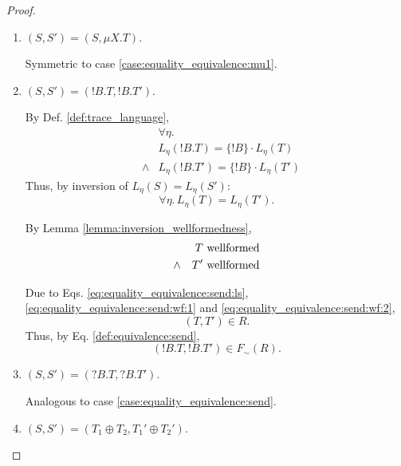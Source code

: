 \documentclass{llncs}
\newcommand*{\sequiv}{\sim}
\newcommand*{\send}{\mathord{!}}
\newcommand*{\recv}{\mathord{?}}
\newcommand*{\echoice}{\oplus}
\newcommand*{\concat}{\cdot}
\newcommand*{\wf}[1]{\text{$#1$ {\normalfont \rmfamily wellformed}}}
\renewcommand*{\|}{\;|\;}
\begin{document}
\begin{proof}
\begin{enumerate}
    \item
      \label{case:equality_equivalence:mu2}
      $(S, S') = (S, \mu X.T)$.

      Symmetric to case \ref{case:equality_equivalence:mu1}.

    \item
      \label{case:equality_equivalence:send}
      $(S, S') = (\send B.T, \send B.T')$.

      By Def. \ref{def:trace_language},
      \begin{eqnarray*}
        &&      \forall \eta. \\
        &&      L_\eta(\send B.T)  = \{\send B\} \concat L_\eta(T) \\
        &\land& L_\eta(\send B.T') = \{\send B\} \concat L_\eta(T')
      \end{eqnarray*}
      Thus, by inversion of $L_\eta(S) = L_\eta(S')$:
      \begin{equation}
        \label{eq:equality_equivalence:send:ls}
        \forall \eta.\, L_\eta(T) = L_\eta(T').
      \end{equation}

      By Lemma \ref{lemma:inversion_wellformedness},
      \begin{eqnarray}
        \label{eq:equality_equivalence:send:wf:1} &&      \wf{T} \\
        \label{eq:equality_equivalence:send:wf:2} &\land& \wf{T'}
      \end{eqnarray}

      Due to Eqs. \ref{eq:equality_equivalence:send:ls},
      \ref{eq:equality_equivalence:send:wf:1} and
      \ref{eq:equality_equivalence:send:wf:2},
      \begin{equation*}
        (T, T') \in R.
      \end{equation*}
      Thus, by Eq. \ref{def:equivalence:send},
      \begin{equation*}
        (\send B.T, \send B.T') \in F_\sequiv(R).
      \end{equation*}

    \item
      \label{case:equality_equivalence:recv}
      $(S, S') = (\recv B.T, \recv B.T')$.

      Analogous to case \ref{case:equality_equivalence:send}.

    \item
      \label{case:equality_equivalence:echoice}
      $(S, S') = (T_1 \echoice T_2, T_1' \echoice T_2')$.


\end{enumerate}
\end{proof}
\end{document}
